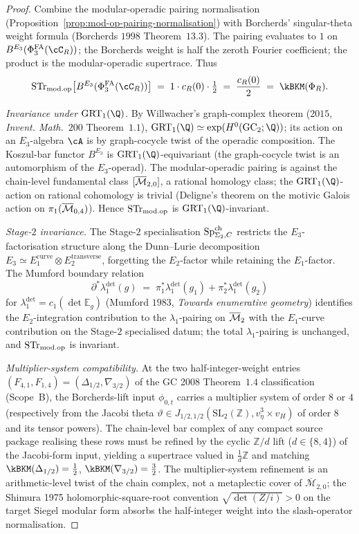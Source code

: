 \begin{proof}
Combine the modular-operadic pairing normalisation
\textup{(Proposition~\ref{prop:mod-op-pairing-normalisation})} with
Borcherds' singular-theta weight formula \textup{(Borcherds $1998$
Theorem~$13.3$)}. The pairing evaluates to $1$ on
$B^{E_3}(\PhiFA_3(\cC_R))$; the Borcherds weight is half the zeroth
Fourier coefficient; the product is the modular-operadic supertrace.
Thus
\[
 \STr_{\modop}\bigl[B^{E_3}(\PhiFA_3(\cC_R))\bigr]
 \;=\; 1 \cdot c_R(0) \cdot \tfrac{1}{2}
 \;=\; \frac{c_R(0)}{2}
 \;=\; \kBKM(\Phi_R).
\]

\emph{Invariance under $\GRTone(\Q)$.} By Willwacher's graph-complex
theorem ($2015$, \emph{Invent. Math.}~$200$ Theorem~$1.1$),
$\GRTone(\Q) \simeq \exp(H^0(\mathrm{GC}_2; \Q))$; its action on an
$E_3$-algebra $\cA$ is by graph-cocycle twist of the operadic
composition. The Koszul-bar functor $B^{E_3}$ is $\GRTone(\Q)$-equivariant
(the graph-cocycle twist is an automorphism of the $E_3$-operad).
The modular-operadic pairing is against the chain-level fundamental
class $[\overline{\mathcal{M}}_{2, 0}]$, a rational homology class; the
$\GRTone(\Q)$-action on rational cohomology is trivial (Deligne's
theorem on the motivic Galois action on $\pi_1(\overline{\mathcal{M}}_{0, 4})$). Hence
$\mathrm{STr}_{\mathrm{mod.op}}$ is $\GRTone(\Q)$-invariant.

\emph{Stage-$2$ invariance.} The Stage-$2$ specialisation $\mathrm{Sp}^{\mathrm{ch}}_{\Sigma_2,
C}$ restricts the $E_3$-factorisation structure along the
Dunn--Lurie decomposition $E_3 \simeq E_1^{\mathrm{curve}} \otimes
E_2^{\mathrm{transverse}}$, forgetting the $E_2$-factor while retaining
the $E_1$-factor. The Mumford boundary relation
\[
 \partial^* \lambda_1^{\det}(g)
 \;=\; \pi_1^* \lambda_1^{\det}(g_1)
      + \pi_2^* \lambda_1^{\det}(g_2)
\]
for $\lambda_1^{\det}=c_1(\det \mathbb E_g)$ (Mumford $1983$,
\emph{Towards enumerative geometry}) identifies the
$E_2$-integration contribution to the $\lambda_1$-pairing on $\overline{\mathcal{M}}_2$
with the $E_1$-curve contribution on the Stage-$2$ specialised datum;
the total $\lambda_1$-pairing is unchanged, and
$\mathrm{STr}_{\mathrm{mod.op}}$ is invariant.

\emph{Multiplier-system compatibility.} At the two half-integer-weight
entries $(F_{4, 1}, F_{1, 4}) = (\Delta_{1/2}, \nabla_{3/2})$ of the GC
2008 Theorem~$1.4$ classification (Scope~B), the Borcherds-lift input
$\phi_{0, t}$ carries a multiplier system of order $8$ or $4$
(respectively from the Jacobi theta $\vartheta \in J_{1/2, 1/2}(
\mathrm{SL}_2(\mathbb{Z}), v_\eta^3 \times v_H)$ of order $8$ and its
tensor powers). The chain-level bar complex
of any compact source package realising these rows must be refined by
the cyclic $\mathbb{Z}/d$ lift ($d \in \{8, 4\}$) of the Jacobi-form
input, yielding a supertrace valued in $\tfrac{1}{d}\mathbb{Z}$ and matching
$\kBKM(\Delta_{1/2}) = \tfrac{1}{2}$, $\kBKM(\nabla_{3/2}) =
\tfrac{3}{2}$. The multiplier-system refinement is an arithmetic-level
twist of the chain complex, not a metaplectic cover of
$\overline{\mathcal{M}}_{2, 0}$; the Shimura 1975 holomorphic-square-root
convention $\sqrt{\det(Z/i)} > 0$ on the target Siegel modular form
absorbs the half-integer weight into the slash-operator normalisation.


\end{proof}
